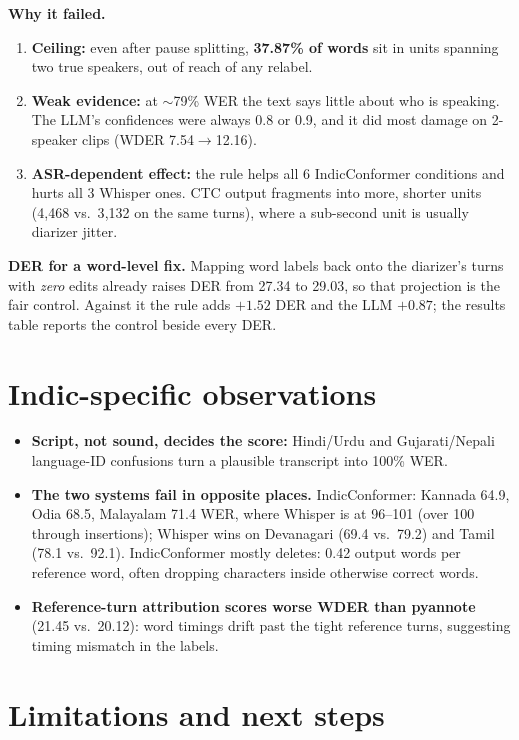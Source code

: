 \documentclass[10pt]{article}
\newcommand{\ra}{$\rightarrow$}
\begin{document}
\textbf{Why it failed.}
\begin{enumerate}
  \item \textbf{Ceiling:} even after pause splitting, \textbf{37.87\% of words} sit in units spanning two true speakers,
        out of reach of any relabel.
  \item \textbf{Weak evidence:} at $\sim$79\% WER the text says little about who is speaking. The LLM's confidences were
        always 0.8 or 0.9, and it did most damage on 2-speaker clips (WDER 7.54\ra12.16).
  \item \textbf{ASR-dependent effect:} the rule helps all 6 IndicConformer conditions and hurts all 3 Whisper ones. CTC
        output fragments into more, shorter units (4{,}468 vs.\ 3{,}132 on the same turns), where a sub-second unit is
        usually diarizer jitter.
\end{enumerate}
\textbf{DER for a word-level fix.} Mapping word labels back onto the diarizer's turns with \emph{zero} edits already
raises DER from 27.34 to 29.03, so that projection is the fair control. Against it the rule adds $+1.52$ DER and the
LLM $+0.87$; the results table reports the control beside every DER.

\section{Indic-specific observations}

\begin{itemize}
  \item \textbf{Script, not sound, decides the score:} Hindi/Urdu and Gujarati/Nepali language-ID confusions turn a
        plausible transcript into 100\% WER.
  \item \textbf{The two systems fail in opposite places.} IndicConformer: Kannada 64.9, Odia 68.5, Malayalam 71.4 WER,
        where Whisper is at 96--101 (over 100 through insertions); Whisper wins on Devanagari (69.4 vs.\ 79.2) and Tamil
        (78.1 vs.\ 92.1). IndicConformer mostly deletes: 0.42 output words per reference word, often dropping characters
        inside otherwise correct words.
  \item \textbf{Reference-turn attribution scores worse WDER than pyannote} (21.45 vs.\ 20.12): word timings drift past
        the tight reference turns, suggesting timing mismatch in the labels.
\end{itemize}

\section{Limitations and next steps}
\end{document}
